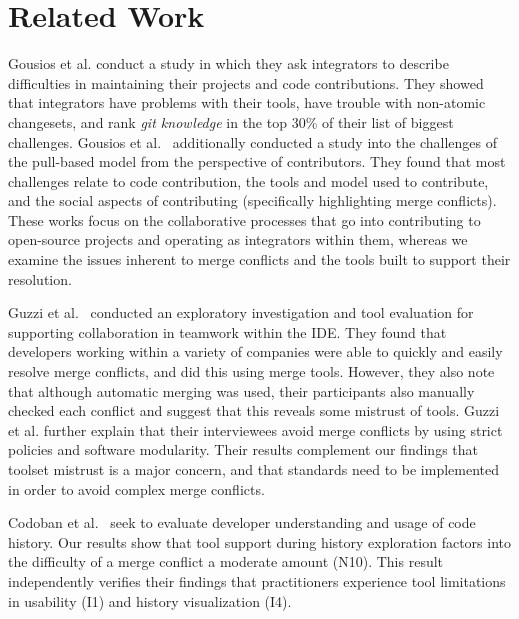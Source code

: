 \section{Related Work}\label{related_work}

Gousios et al. \cite{integrator_perspective} conduct a study in which they ask integrators to describe difficulties in maintaining their projects and code contributions. 
They showed that integrators have problems with their tools, have trouble with non-atomic changesets, and rank \textit{git knowledge} in the top 30\% of their list of biggest challenges. 
Gousios et al.~\cite{gousios2016work} additionally conducted a study into the challenges of the pull-based model from the perspective of contributors. 
They found that most challenges relate to code contribution, the tools and model used to contribute, and the social aspects of contributing (specifically highlighting merge conflicts).
These works focus on the collaborative processes that go into contributing to open-source projects and operating as integrators within them, whereas we examine the issues inherent to merge conflicts and the tools built to support their resolution.

Guzzi et al.~\cite{Guzzi2015} conducted an exploratory investigation and tool evaluation for supporting collaboration in teamwork within the IDE.
They found that developers working within a variety of companies were able to quickly and easily resolve merge conflicts, and did this using merge tools.
However, they also note that although automatic merging was used, their participants also manually checked each conflict and suggest that this reveals some mistrust of tools.
Guzzi et al. further explain that their interviewees avoid merge conflicts by using strict policies and software modularity.
Their results complement our findings that toolset mistrust is a major concern, and that standards need to be implemented in order to avoid complex merge conflicts.

Codoban et al.~\cite{Mihai_lenses} seek to evaluate developer understanding and usage of code history. Our results show that tool support during history exploration factors into the difficulty of a merge conflict a moderate amount (N10). This result independently verifies their findings that practitioners experience tool limitations in usability (I1) and history visualization (I4).